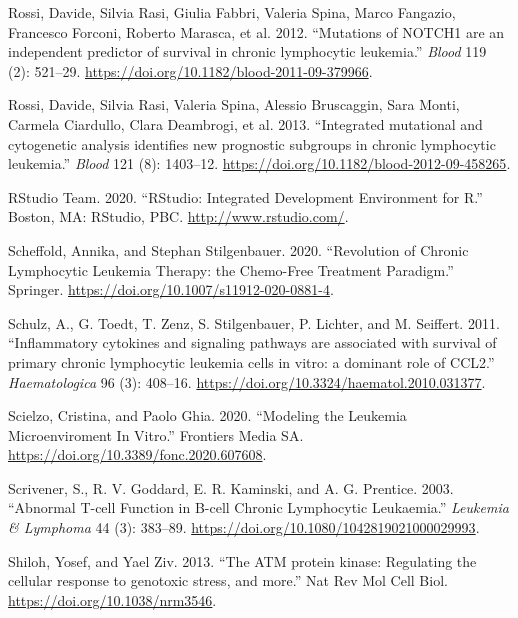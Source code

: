 \documentclass[11pt, a4paper, twosided]{book}
\newenvironment{CSLReferences}%
  {}%
  {\par}
\begin{document}
\begin{CSLReferences}{1}{0}
\leavevmode{}%
Rossi, Davide, Silvia Rasi, Giulia Fabbri, Valeria Spina, Marco Fangazio, Francesco Forconi, Roberto Marasca, et al. 2012. {``{Mutations of NOTCH1 are an independent predictor of survival in chronic lymphocytic leukemia}.''} \emph{Blood} 119 (2): 521--29. \url{https://doi.org/10.1182/blood-2011-09-379966}.

\leavevmode{}%
Rossi, Davide, Silvia Rasi, Valeria Spina, Alessio Bruscaggin, Sara Monti, Carmela Ciardullo, Clara Deambrogi, et al. 2013. {``{Integrated mutational and cytogenetic analysis identifies new prognostic subgroups in chronic lymphocytic leukemia}.''} \emph{Blood} 121 (8): 1403--12. \url{https://doi.org/10.1182/blood-2012-09-458265}.

\leavevmode{}%
RStudio Team. 2020. {``{RStudio: Integrated Development Environment for R}.''} Boston, MA: RStudio, PBC. \url{http://www.rstudio.com/}.

\leavevmode{}%
Scheffold, Annika, and Stephan Stilgenbauer. 2020. {``{Revolution of Chronic Lymphocytic Leukemia Therapy: the Chemo-Free Treatment Paradigm}.''} Springer. \url{https://doi.org/10.1007/s11912-020-0881-4}.

\leavevmode{}%
Schulz, A., G. Toedt, T. Zenz, S. Stilgenbauer, P. Lichter, and M. Seiffert. 2011. {``{Inflammatory cytokines and signaling pathways are associated with survival of primary chronic lymphocytic leukemia cells in vitro: a dominant role of CCL2}.''} \emph{Haematologica} 96 (3): 408--16. \url{https://doi.org/10.3324/haematol.2010.031377}.

\leavevmode{}%
Scielzo, Cristina, and Paolo Ghia. 2020. {``{Modeling the Leukemia Microenviroment In Vitro}.''} Frontiers Media SA. \url{https://doi.org/10.3389/fonc.2020.607608}.

\leavevmode{}%
Scrivener, S., R. V. Goddard, E. R. Kaminski, and A. G. Prentice. 2003. {``{Abnormal T-cell Function in B-cell Chronic Lymphocytic Leukaemia}.''} \emph{Leukemia \& Lymphoma} 44 (3): 383--89. \url{https://doi.org/10.1080/1042819021000029993}.

\leavevmode{}%
Shiloh, Yosef, and Yael Ziv. 2013. {``{The ATM protein kinase: Regulating the cellular response to genotoxic stress, and more}.''} Nat Rev Mol Cell Biol. \url{https://doi.org/10.1038/nrm3546}.


\end{CSLReferences}
\end{document}
